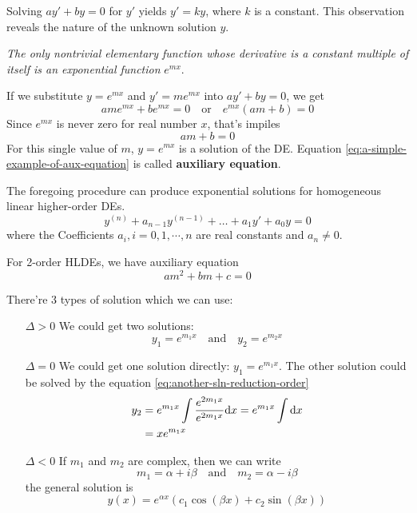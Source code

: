 \documentclass{beaulivre}
\begin{document}
\begin{example}
Solving $ay' + by = 0$ for $y'$ yields $y' = ky$, 
where $k$ is a constant. This observation reveals
the nature of the unknown solution $y$.

\emph{The only nontrivial elementary function whose
derivative is a constant multiple of itself is 
an exponential function} $e^{mx}$.

If we substitute $y = e^{mx}$ and $y' = me^{mx}$ into $ay' + by = 0$, 
we get
\[
    ame^{mx} + be^{mx} = 0 \quad \mbox{or} \quad e^{mx}(am + b) = 0
\]
Since $e^{mx}$ is never zero for real number $x$, that's impiles
\begin{equation}\label{eq:a-simple-example-of-aux-equation}
    am + b = 0
\end{equation}
For this single value of $m$, $y = e^{mx}$ is a solution of the DE.
Equation \ref{eq:a-simple-example-of-aux-equation} is called \textbf{auxiliary equation}.
\end{example}

The foregoing procedure can produce exponential solutions
for homogeneous linear higher-order DEs.
\begin{equation}\label{eq:standard-form-high-order-homogeneous-linear-DE}
    y^{(n)} + a_{n-1}y^{(n-1)} + \ldots + a_1y' + a_0y = 0
\end{equation}
where the Coefficients $a_i, i = 0, 1, \cdots, n$ are real constants
and $a_n \neq 0$.

For 2-order HLDEs, we have auxiliary equation
\[
    am^2 + bm + c = 0
\]

There're 3 types of solution which we can use:
\begin{itemize}
    \item[$\Delta > 0$] We could get two solutions: 
        \[
            y_1 = e^{m_1x} \quad \mbox{and} \quad y_2 = e^{m_2x}
        \]
    \item[$\Delta = 0$] We could get one solution directly: $y_1 = e^{m_1x}$.
        The other solution could be solved by the equation 
        \ref{eq:another-sln-reduction-order}
        \begin{align}
            y_2 &= e^{m_1 x} \int \dfrac{e^{2 m_1 x}}{e^{2 m_1 x}} \mathrm{d}x = e^{m_1 x} \int \mathrm{d}x \notag \\
                &= x e^{m_1 x}
        \end{align}
    \item[$\Delta < 0$]
        If $m_1$ and $m_2$ are complex, then we can write
        \[
            m_1 = \alpha + i \beta \quad \mbox{and} \quad m_2 = \alpha - i \beta
        \]
        the general solution is
        \begin{equation}
            y(x) = e^{\alpha x}(c_1 \cos(\beta x) + c_2 \sin(\beta x))
        \end{equation}
\end{itemize}

\cleardoublepage

\end{document}
